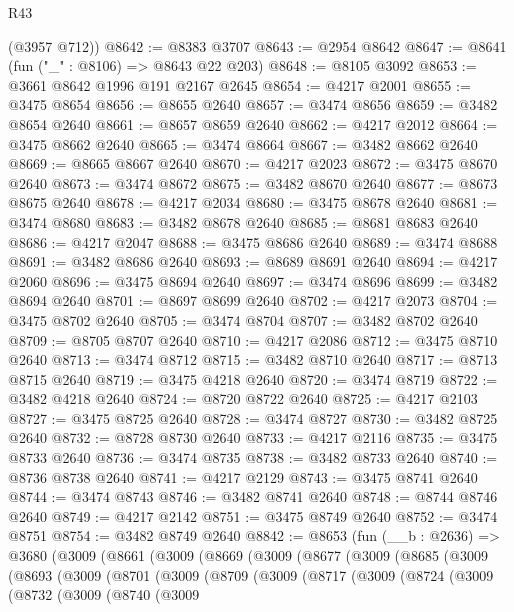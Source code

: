 \begin{lexlean}{R43}
\begin{coremodule}
      (@3957 @712))
@8642 := @8383 @3707
@8643 := @2954 @8642
@8647 := @8641 (fun ("_" : @8106) => @8643 @22 @203)
@8648 := @8105 @3092
@8653 := @3661 @8642 @1996 @191 @2167 @2645
@8654 := @4217 @2001
@8655 := @3475 @8654
@8656 := @8655 @2640
@8657 := @3474 @8656
@8659 := @3482 @8654 @2640
@8661 := @8657 @8659 @2640
@8662 := @4217 @2012
@8664 := @3475 @8662 @2640
@8665 := @3474 @8664
@8667 := @3482 @8662 @2640
@8669 := @8665 @8667 @2640
@8670 := @4217 @2023
@8672 := @3475 @8670 @2640
@8673 := @3474 @8672
@8675 := @3482 @8670 @2640
@8677 := @8673 @8675 @2640
@8678 := @4217 @2034
@8680 := @3475 @8678 @2640
@8681 := @3474 @8680
@8683 := @3482 @8678 @2640
@8685 := @8681 @8683 @2640
@8686 := @4217 @2047
@8688 := @3475 @8686 @2640
@8689 := @3474 @8688
@8691 := @3482 @8686 @2640
@8693 := @8689 @8691 @2640
@8694 := @4217 @2060
@8696 := @3475 @8694 @2640
@8697 := @3474 @8696
@8699 := @3482 @8694 @2640
@8701 := @8697 @8699 @2640
@8702 := @4217 @2073
@8704 := @3475 @8702 @2640
@8705 := @3474 @8704
@8707 := @3482 @8702 @2640
@8709 := @8705 @8707 @2640
@8710 := @4217 @2086
@8712 := @3475 @8710 @2640
@8713 := @3474 @8712
@8715 := @3482 @8710 @2640
@8717 := @8713 @8715 @2640
@8719 := @3475 @4218 @2640
@8720 := @3474 @8719
@8722 := @3482 @4218 @2640
@8724 := @8720 @8722 @2640
@8725 := @4217 @2103
@8727 := @3475 @8725 @2640
@8728 := @3474 @8727
@8730 := @3482 @8725 @2640
@8732 := @8728 @8730 @2640
@8733 := @4217 @2116
@8735 := @3475 @8733 @2640
@8736 := @3474 @8735
@8738 := @3482 @8733 @2640
@8740 := @8736 @8738 @2640
@8741 := @4217 @2129
@8743 := @3475 @8741 @2640
@8744 := @3474 @8743
@8746 := @3482 @8741 @2640
@8748 := @8744 @8746 @2640
@8749 := @4217 @2142
@8751 := @3475 @8749 @2640
@8752 := @3474 @8751
@8754 := @3482 @8749 @2640
@8842 := @8653
    (fun (__b : @2636) =>
    @3680
      (@3009
        (@8661
          (@3009
            (@8669
              (@3009
                (@8677
                  (@3009
                    (@8685
                      (@3009
                        (@8693
                          (@3009
                            (@8701
                              (@3009
                                (@8709
                                  (@3009
                                    (@8717
                                      (@3009
                                        (@8724
                                          (@3009
                                            (@8732
                                              (@3009
                                                (@8740
                                                  (@3009

\end{coremodule}
\end{lexlean}
